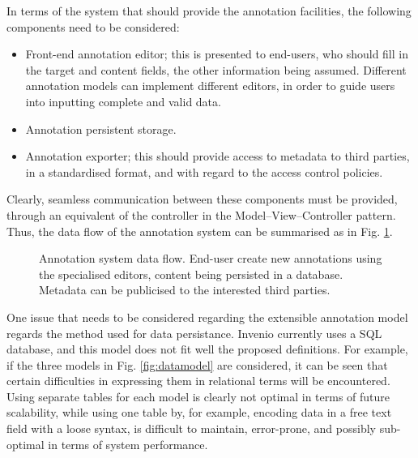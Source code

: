 In terms of the system that should provide the annotation facilities, the
following components need to be considered:
\begin{itemize}
  \item Front-end annotation editor; this is presented to end-users,
        who should fill in the target and content fields, the other information
        being assumed. Different annotation models can implement different
        editors, in order to guide users into inputting complete and valid data.
  \item Annotation persistent storage.
  \item Annotation exporter; this should provide access to metadata to third
        parties, in a standardised format, and with regard to the access control
        policies.
\end{itemize}
Clearly, seamless communication between these components must be provided,
through an equivalent of the controller in the Model--View--Controller pattern.
Thus, the data flow of the annotation system can be summarised as in Fig.
\ref{fig:dataflow}.

\begin{figure}[!ht]
  \centering
  \caption[Annotation system data flow]
          {Annotation system data flow. End-user create new annotations using
           the specialised editors, content being persisted in a database.
           Metadata can be publicised to the interested third parties.}
  \label{fig:dataflow}
\end{figure}

One issue that needs to be considered regarding the extensible annotation model
regards the method used for data persistance. Invenio currently uses a SQL
database, and this model does not fit well the proposed definitions. For
example, if the three models in Fig. \ref{fig:datamodel} are considered, it can
be seen that certain difficulties in expressing them in relational terms will
be encountered. Using separate tables for each model is clearly not optimal in
terms of future scalability, while using one table by, for example, encoding
data in a free text field with a loose syntax, is difficult to maintain,
error-prone, and possibly sub-optimal in terms of system performance.

